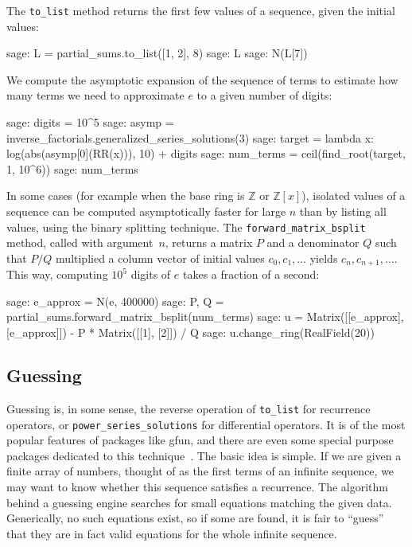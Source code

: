 \documentclass[11pt]{amsart}
\begin{document}
The \verb|to_list| method returns the first few values of a sequence,
given the initial values:

\begin{sageexample}
  sage: L = partial_sums.to_list([1, 2], 8)
  sage: L
  sage: N(L[7])
\end{sageexample}

We compute the asymptotic expansion of the sequence of terms
to estimate how many terms we need to approximate $e$ to a given
number of digits:

\begin{sageexample}
  sage: digits = 10^5
  sage: asymp = inverse_factorials.generalized_series_solutions(3)
  sage: target = lambda x: log(abs(asymp[0](RR(x))), 10) + digits
  sage: num_terms = ceil(find_root(target, 1, 10^6))
  sage: num_terms
\end{sageexample}

In some cases (for example when the base ring is $\mathbb{Z}$ or
$\mathbb{Z}[x]$), isolated values of a sequence can be
computed asymptotically faster for large $n$ than by listing all
values, using the binary splitting technique.
The \verb|forward_matrix_bsplit| method, called with argument~$n$,
returns a matrix $P$ and a denominator $Q$ such that $P / Q$ multiplied a
column vector of initial values $c_0, c_1, \ldots$
yields $c_n, c_{n+1}, \ldots$.
This way, computing $10^5$ digits of $e$ takes a fraction of a second:

\begin{sageexample}
  sage: e_approx = N(e, 400000)
  sage: P, Q = partial_sums.forward_matrix_bsplit(num_terms)
  sage: u = Matrix([[e_approx], [e_approx]]) - P * Matrix([[1], [2]]) / Q
  sage: u.change_ring(RealField(20))
\end{sageexample}

\subsection{Guessing}

Guessing is, in some sense, the reverse operation of \verb|to_list| for
recurrence operators, or \verb|power_series_solutions| for differential
operators.  It is of the most popular features of packages like gfun, and there
are even some special purpose packages dedicated to this
technique~\cite{kauers09a,hebisch11}. The basic idea is simple. If we are given
a finite array of numbers, thought of as the first terms of an infinite
sequence, we may want to know whether this sequence satisfies a recurrence. The
algorithm behind a guessing engine searches for small equations matching the
given data.  Generically, no such equations exist, so if some are found, it is
fair to ``guess'' that they are in fact valid equations for the whole infinite
sequence.
\end{document}
